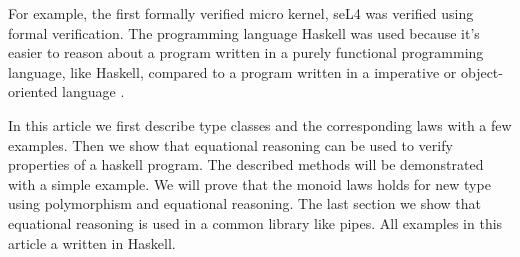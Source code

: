 For example, the first formally verified micro kernel, seL4 was verified using formal verification. The programming language Haskell was used because it's easier to reason about a program written in a purely functional programming language, like Haskell, compared to a program written in a imperative or object-oriented language  \cite{Klein09}. 

In this article we first describe type classes and the corresponding laws with a few examples. Then we show that equational reasoning can be used to verify properties of a haskell program. The described methods will be demonstrated with a simple example. We will prove that the monoid laws holds for new type using polymorphism and equational reasoning. The last section we show that equational reasoning is used in a common library like pipes. All examples in this article a written in Haskell.


